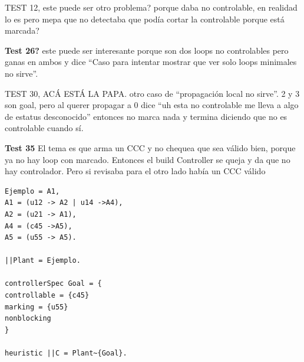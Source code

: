 TEST 12, este puede ser otro problema? porque daba no controlable, en realidad lo es pero mepa que no detectaba que podía cortar la controlable porque está marcada?

\smallskip
\textbf{Test 26?} este puede ser interesante porque son dos loops no controlables pero ganas en ambos y dice ``Caso para intentar mostrar que ver solo loops minimales no sirve''. %

TEST 30, ACÁ ESTÁ LA PAPA. otro caso de ``propagación local no sirve''. 2 y 3 son goal, pero al querer propagar a 0 dice ``uh esta no controlable me lleva a algo de estatus desconocido'' entonces no marca nada y termina diciendo que no es controlable cuando sí. %

\smallskip
\textbf{Test 35} El tema es que arma un CCC y no chequea que sea válido bien, porque ya no hay loop con marcado. Entonces el build Controller se queja y da que no hay controlador. Pero si revisaba para el otro lado había un CCC válido




\begin{lstlisting}[language = mtsa, caption=Test 1 a modo de ejemplo] 
Ejemplo = A1,
A1 = (u12 -> A2 | u14 ->A4),
A2 = (u21 -> A1),
A4 = (c45 ->A5),
A5 = (u55 -> A5).

||Plant = Ejemplo.

controllerSpec Goal = {
controllable = {c45}
marking = {u55}
nonblocking
}

heuristic ||C = Plant~{Goal}.
\end{lstlisting}
